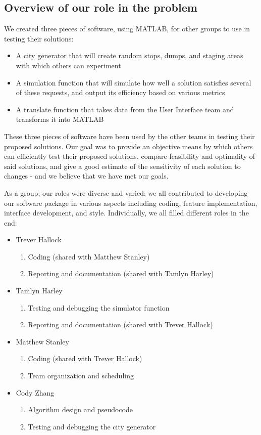 \documentclass{article}
\begin{document}
\subsection{Overview of our role in the problem}

We created three pieces of software, using MATLAB, for other groups to use in testing their solutions:

\begin{itemize}
\item A city generator that will create random stops, dumps, and staging areas with which others can experiment
\item A simulation function that will simulate how well a solution satisfies several of these requests, and output its efficiency based on various metrics
\item A translate function that takes data from the User Interface team and transforms it into MATLAB
\end{itemize}

These three pieces of software have been used by the other teams in testing their proposed solutions.  Our goal was to provide an objective means by which others can efficiently test their proposed solutions, compare feasibility and optimality of said solutions, and give a good estimate of the sensitivity of each solution to changes - and we believe that we have met our goals.


As a group, our roles were diverse and varied; we all contributed to developing our software package in various aspects including coding, feature implementation, interface development, and style.  Individually, we all filled different roles in the end:

\begin{itemize}
	\item Trever Hallock
	\begin{enumerate}
		\item Coding (shared with Matthew Stanley)
		\item Reporting and documentation (shared with Tamlyn Harley)
	\end{enumerate}
	\item Tamlyn Harley
	\begin{enumerate}
		\item Testing and debugging the simulator function
		\item Reporting and documentation (shared with Trever Hallock)
	\end{enumerate}
	\item Matthew Stanley
	\begin{enumerate}
		\item Coding (shared with Trever Hallock)
		\item Team organization and scheduling
	\end{enumerate}
	\item Cody Zhang
	\begin{enumerate}
		\item Algorithm design and pseudocode
		\item Testing and debugging the city generator
	\end{enumerate}
\end{itemize}
\end{document}
